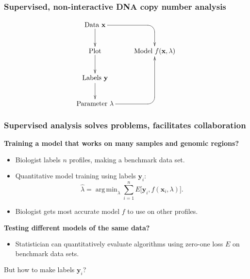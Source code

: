 \documentclass{beamer}
\DeclareMathOperator*{\argmin}{arg\,min}
\begin{document}
\begin{frame}
  \frametitle{Supervised, non-interactive DNA copy number analysis}
  \begin{displaymath}
  \xymatrix{
    \text{Data $\mathbf x$}
    \ar `[r] [dr] 
    \ar [d]
    & \text{ }
    \\
    \text{Plot} 
    \ar [d]
    & 
    \text{Model $f(\mathbf x, \lambda)$} 
    \\
    \text{Labels $\mathbf y$}       
    \ar [d]
    \\
    \text{Parameter $\lambda$} 
    \ar `r[ruu] [ruu]
    & \text{ }
  }
  \end{displaymath}
\end{frame}

\begin{frame}
  \frametitle{Supervised analysis solves problems, facilitates
    collaboration}
  \textbf{Training a model that works on many samples and genomic
    regions?} 
  \begin{itemize}
  \item Biologist labels $n$ profiles, making a benchmark data set.
  \item Quantitative model training using labels $\mathbf y_i$:
  \begin{equation*}
    \hat \lambda = \argmin_{\lambda}
    \sum_{i=1}^n
    E\big[
      \mathbf y_i,
      f(\mathbf x_i, \lambda)
    \big].
  \end{equation*}
  \item Biologist gets most accurate model $f$ to use on other profiles.
  \end{itemize}
  \textbf{Testing different models of the same data?} 
  \begin{itemize}
  \item Statistician can quantitatively evaluate algorithms using
    zero-one loss $E$ on benchmark data sets.
  \end{itemize}
  But how to make labels $\mathbf y_i$?
\end{frame}
\end{document}
